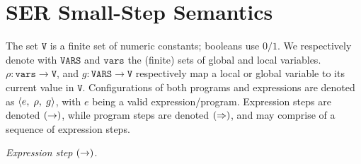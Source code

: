 \section{SER Small-Step Semantics}
\label{appendix:ser-semantics}

%
%
The set \(\texttt{V}\) is a finite set of numeric constants; booleans use $0/1$. We respectively denote with \(\texttt{VARS}\) and \(\texttt{vars}\) the (finite) sets of global and local variables. $\rho:{\texttt{vars}}\to \texttt{V}$, and $g:{\texttt{VARS}}\to \texttt{V}$ respectively map a local or global variable to its current value in \(\texttt{V}\).
%
Configurations of both programs and expressions are denoted as $\langle e,\; \rho,\; g\rangle$, with \(e\) being a valid \toolname{} expression/program. 
%
Expression steps are denoted $(\mathrel{\rightarrow})$, while program steps are denoted $(\mathrel{\Rightarrow})$, and may comprise of a sequence of expression steps.
%
%

\smallskip
\noindent\textit{Expression step} $(\mathrel{\rightarrow})$.
	
